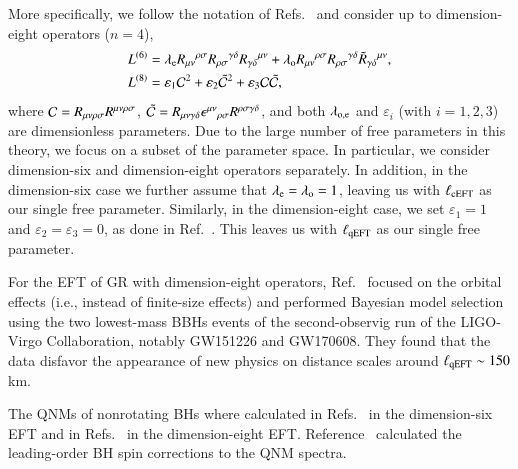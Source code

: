 \documentclass[twocolumn,
               prd,
               aps,
               superscriptaddress,
               tightenlines,
               nofootinbib,
               eqsecnum,
               amsfonts,
               amsmath,
               longbibliography]{revtex4-1}
\newcommand{\lame}{\lambda_{\rm e}}
\newcommand{\lamo}{\lambda_{\rm o}}
\begin{document}
More specifically, we follow the notation of
Refs.~\cite{Cano:2020cao,Cano:2021myl} and consider up to dimension-eight
operators ($n=4$),
%
\begin{subequations}
\label{eq:action_mods}
\begin{align}
    L^{(6)} &= \lame R_{\mu\nu}{}^{\rho\sigma} R_{\rho\sigma}{}^{\gamma\delta} R_{\gamma \delta}{}^{\mu\nu}
    + \lamo R_{\mu\nu}{}^{\rho\sigma} R_{\rho\sigma}{}^{\gamma\delta} \tilde{R}_{\gamma \delta}{}^{\mu\nu},
    \label{eq:s_6}
    \\
    L^{(8)} &= \varepsilon_{1} \mathcal{C}^2
    + \varepsilon_{2} \tilde{\mathcal{C}}^{2}
    + \varepsilon_{3} \mathcal{C} \tilde{\mathcal{C}},
\label{eq:s_8}
\end{align}
\end{subequations}
%
where ${\cal C} = R_{\mu\nu\rho\sigma} R^{\mu\nu\rho\sigma}$,
$\tilde{\cal C} = R_{\mu\nu\gamma\delta} \epsilon^{\mu\nu}{}_{\rho\sigma} R^{\rho\sigma\gamma\delta}$,
and both $\lambda_{\rm o, e}$ and $\varepsilon_{i}$ (with $i=1, 2, 3$) are dimensionless parameters.
%
Due to the large number of free parameters in this theory, we focus on a subset of the parameter space.
%
In particular, we consider dimension-six and dimension-eight operators separately.
%
In addition, in the dimension-six case we further assume that $\lame = \lamo = 1$,
leaving us with $\ell_{\rm cEFT}$ as our single free parameter.
%
Similarly, in the dimension-eight case, we set $\varepsilon_{1} = 1$ and $\varepsilon_{2} = \varepsilon_{3} = 0$,
as done in Ref.~\cite{Sennett:2019bpc}.
%
This leaves us with $\ell_{\rm qEFT}$ as our single free parameter.


For the EFT of GR with dimension-eight operators, Ref.~\cite{Sennett:2019bpc} focused on the
orbital effects (i.e., instead of finite-size effects) and performed
Bayesian model selection using the two lowest-mass BBHs events of the second-observig run of
the LIGO-Virgo Collaboration, notably GW151226 and GW170608. They found that the
data disfavor the appearance of new physics on distance scales around $\ell_{\rm qEFT} \sim 150$ km.

The QNMs of nonrotating BHs where calculated in Refs.~\cite{deRham:2020ejn,Cano:2020cao} in the dimension-six EFT
and in Refs.~\cite{Cardoso:2018ptl,Cano:2020cao} in the dimension-eight EFT.
%
Reference~\cite{Cano:2020cao} calculated the leading-order BH spin corrections to the QNM spectra.

\end{document}
